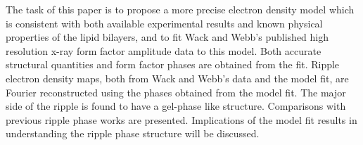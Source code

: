 

The task of this paper is to propose a more precise electron density model 
which is consistent with both available experimental results and known 
physical properties of the lipid bilayers, and to fit Wack and Webb's
published high resolution x-ray form factor amplitude data \cite{Wac89a}
 to this model. Both accurate structural quantities and form factor phases 
are obtained from the fit. Ripple electron density maps, both from Wack 
and Webb's data and the model fit, are Fourier reconstructed using the 
phases obtained from the model fit. The major side of the ripple is 
found to have a gel-phase like structure. Comparisons with previous ripple 
phase works are presented. Implications of the model fit results in 
understanding the ripple phase structure will be discussed.
